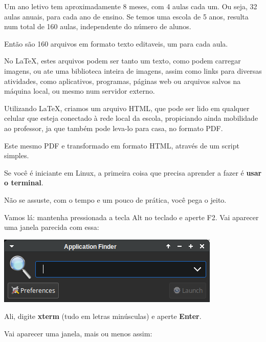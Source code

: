 \begin{multicols}{2}
	Um ano letivo tem aproximadamente 8 meses, com 4 aulas cada um. Ou seja, 32 aulas anuais, para cada ano de ensino. Se temos uma escola de 5 anos, resulta num total de 160 aulas, independente do número de alunos.
	
	Então são 160 arquivos em formato texto editaveis, um para cada aula.
	
	No \LaTeX, estes arquivos podem ser tanto um texto, como podem carregar imagens, ou ate uma biblioteca inteira de imagens, assim como links para diversas atividades, como aplicativos, programas, páginas web ou arquivos salvos na máquina local, ou mesmo num servidor externo.
	
	Utilizando \LaTeX, criamos um arquivo HTML, que pode ser lido em qualquer celular que esteja conectado à rede local da escola, propiciando ainda mobilidade ao professor, ja que também pode leva-lo para casa, no formato PDF.
	
	Este mesmo PDF e transformado em formato HTML, através de um script simples.
	
	
Se você é iniciante em Linux, a primeira coisa que precisa aprender a fazer é \textbf{usar o terminal}.

Não se assuste, com o tempo e um pouco de prática, você pega o jeito.

Vamos lá: mantenha pressionada a tecla Alt no teclado e aperte F2. Vai aparecer uma janela parecida com essa: 

\begin{center}
	\includegraphics[width=\linewidth]{./IMG-GIT/Screenshot_20231222_142820.png}
\end{center}

Ali, digite \textbf{xterm} (tudo em letras minúsculas) e aperte \textbf{Enter}.

Vai aparecer uma janela, mais ou menos assim:



\end{multicols}
